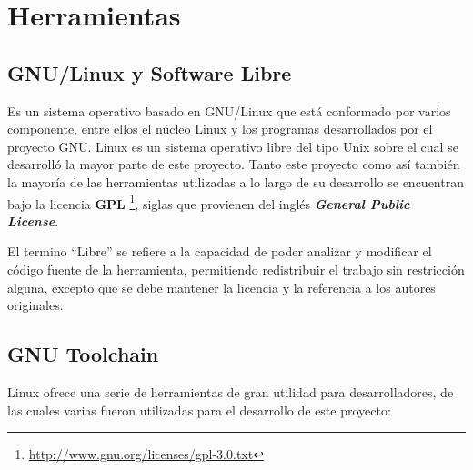 \section{Herramientas}

\subsection{GNU/Linux y Software Libre}

Es un sistema operativo basado en GNU/Linux que está conformado por varios componente, entre ellos el núcleo Linux y los programas desarrollados por el proyecto GNU.
Linux es un sistema operativo libre del tipo Unix sobre el cual se desarrolló la mayor parte de este proyecto. Tanto este proyecto como así también la mayoría de las herramientas utilizadas a lo largo de su desarrollo se encuentran bajo la licencia \textbf{GPL} \footnote{\url{http://www.gnu.org/licenses/gpl-3.0.txt}}, siglas que provienen del inglés \textbf{\textit{General Public License}}. 

El termino ``Libre'' se refiere a la capacidad de poder analizar y modificar el código fuente de la herramienta, permitiendo redistribuir 
el trabajo sin restricción alguna, excepto que se debe mantener la licencia y la referencia a los autores originales. 

\subsection{GNU Toolchain}

Linux ofrece una serie de herramientas de gran utilidad para desarrolladores, de las cuales varias fueron utilizadas para el desarrollo de este proyecto:

